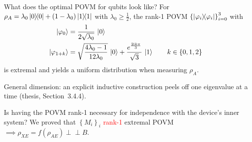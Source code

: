 \documentclass[aspectratio=169]{beamer}
\begin{document}
\appendix
\begin{frame}{What does the optimal POVM for qubits look like?}
	For $\rho_A=\lambda_0\left|0\middle\rangle\!\middle\langle0\right|+(1-\lambda_0)\left|1\middle\rangle\!\middle\langle1\right|$ with $\lambda_0\geqslant\frac12$, the rank-1 POVM $\left\{\left|\varphi_i\middle\rangle\!\middle\langle\varphi_i\right|\right\}_{i=0}^3$ with
    \begin{equation*}
        \begin{aligned}
            \left|\varphi_0\right\rangle &= \frac{1}{2\sqrt{\lambda_0}}\,\left|0\right\rangle\\
            \left|\varphi_{1+k}\right\rangle &= \sqrt{\frac{4\lambda_0-1}{12\lambda_0}}\,\left|0\right\rangle+\frac{e^{\frac{2\mathrm{i}k\pi}{3}}}{\sqrt{3}}\,\left|1\right\rangle\qquad k\in\{0,1,2\}
        \end{aligned}
    \end{equation*}
	is extremal and yields a uniform distribution when measuring $\rho_A$.

	\vspace{2mm}
	General dimension: an explicit inductive construction peels off one eigenvalue at a time (thesis, Section~3.4.4).
\end{frame}

\begin{frame}{Is having the POVM rank-1 necessary for independence with the device's inner system?}
    We proved that $\left\{M_i\right\}_i$ \textcolor<2>{red}{rank-1} extremal POVM $\implies\rho_{XE}=f\left(\rho_{AE}\right)\perp\!\!\perp B$.



\end{frame}
\end{document}
